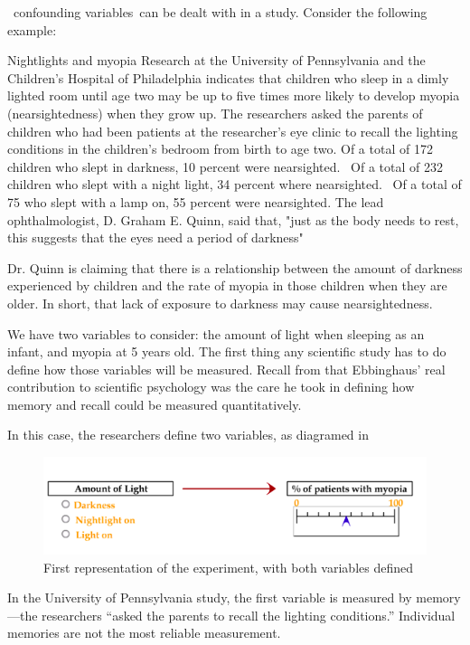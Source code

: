 \begin{refsection}
 confounding variables can be dealt with in a study. Consider the following example:

\begin{apatextbox}{Nightlights and myopia}
Research at the University of Pennsylvania and the Children's Hospital of Philadelphia indicates that children who sleep in a dimly lighted room until age two may be up to five times more likely to develop myopia (nearsightedness) when they grow up.\newline
The researchers asked the parents of children who had been patients at the researcher's eye clinic to recall the lighting conditions in the children's bedroom from birth to age two.\newline
Of a total of 172 children who slept in darkness, 10 percent were nearsighted.  Of a total of 232 children who slept with a night light, 34 percent where nearsighted.  Of a total of 75 who slept with a lamp on, 55 percent were nearsighted.\newline
The lead ophthalmologist, D. Graham E. Quinn, said that, "just as the body needs to rest, this suggests that the eyes need a period of darkness" 
\end{apatextbox}

Dr. Quinn is claiming that there is a relationship between the amount of darkness experienced by children and the rate of myopia in those children when they are older. In short, that lack of exposure to darkness may cause nearsightedness.

We have two variables to consider: the amount of light when sleeping as an infant, and myopia at 5 years old. The first thing any scientific study has to do define how those variables will be measured. Recall from  that Ebbinghaus' real contribution to scientific psychology was the care he took in defining how memory and recall could be measured quantitatively. 

In this case, the researchers define two variables, as diagramed in 
\begin{figure}\includegraphics{../images/hypothesis2.png}\caption{First representation of the experiment, with both variables defined}\label{fig:hypothesis2}\end{figure}
 In the University of Pennsylvania study, the first variable is measured by memory---the researchers ``asked the parents to recall the lighting conditions.'' Individual memories are not the most reliable measurement. 


\end{refsection}
